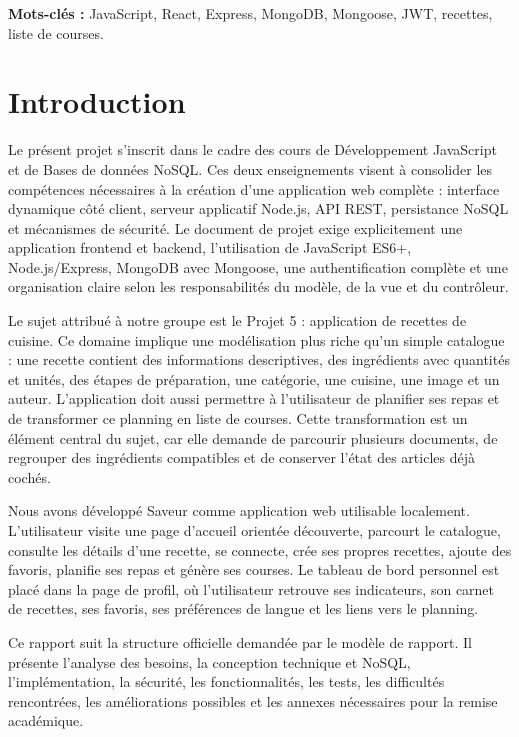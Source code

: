 \documentclass[12pt,a4paper]{report}
\begin{document}
\textbf{Mots-clés :} JavaScript, React, Express, MongoDB, Mongoose, JWT, recettes, liste de courses.
\tableofcontents
\listoffigures
\listoftables

\chapter{Introduction}
Le présent projet s'inscrit dans le cadre des cours de Développement JavaScript et de Bases de données NoSQL. Ces deux enseignements visent à consolider les compétences nécessaires à la création d'une application web complète : interface dynamique côté client, serveur applicatif Node.js, API REST, persistance NoSQL et mécanismes de sécurité. Le document de projet exige explicitement une application frontend et backend, l'utilisation de JavaScript ES6+, Node.js/Express, MongoDB avec Mongoose, une authentification complète et une organisation claire selon les responsabilités du modèle, de la vue et du contrôleur.

Le sujet attribué à notre groupe est le Projet 5 : application de recettes de cuisine. Ce domaine implique une modélisation plus riche qu'un simple catalogue : une recette contient des informations descriptives, des ingrédients avec quantités et unités, des étapes de préparation, une catégorie, une cuisine, une image et un auteur. L'application doit aussi permettre à l'utilisateur de planifier ses repas et de transformer ce planning en liste de courses. Cette transformation est un élément central du sujet, car elle demande de parcourir plusieurs documents, de regrouper des ingrédients compatibles et de conserver l'état des articles déjà cochés.

Nous avons développé Saveur comme application web utilisable localement. L'utilisateur visite une page d'accueil orientée découverte, parcourt le catalogue, consulte les détails d'une recette, se connecte, crée ses propres recettes, ajoute des favoris, planifie ses repas et génère ses courses. Le tableau de bord personnel est placé dans la page de profil, où l'utilisateur retrouve ses indicateurs, son carnet de recettes, ses favoris, ses préférences de langue et les liens vers le planning.

Ce rapport suit la structure officielle demandée par le modèle de rapport. Il présente l'analyse des besoins, la conception technique et NoSQL, l'implémentation, la sécurité, les fonctionnalités, les tests, les difficultés rencontrées, les améliorations possibles et les annexes nécessaires pour la remise académique.
\end{document}
